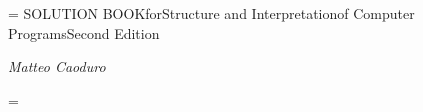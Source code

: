 \footline = {}
\decr\pageno
\tit SOLUTION BOOK\nl for\nl Structure and Interpretation\nl of Computer Programs\nl Second Edition
\bigskip
\centerline{\typoscale[1300/1300]\it Matteo Caoduro}
\vfill\eject
\footline = {\hss \rmfixed \folio \hss}

